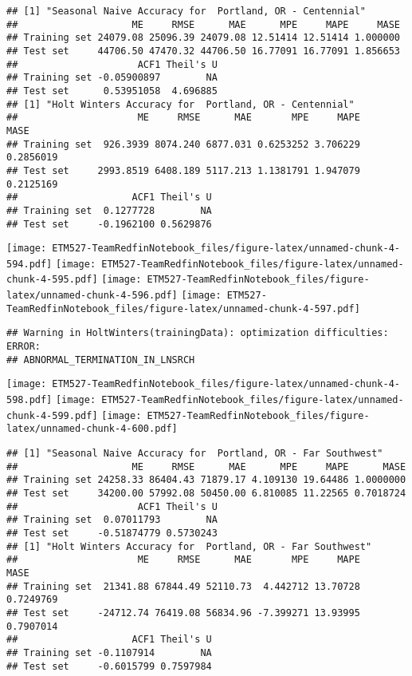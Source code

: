 \documentclass[]{article}
\begin{document}
\begin{verbatim}
## [1] "Seasonal Naive Accuracy for  Portland, OR - Centennial"
##                    ME     RMSE      MAE      MPE     MAPE     MASE
## Training set 24079.08 25096.39 24079.08 12.51414 12.51414 1.000000
## Test set     44706.50 47470.32 44706.50 16.77091 16.77091 1.856653
##                     ACF1 Theil's U
## Training set -0.05900897        NA
## Test set      0.53951058  4.696885
## [1] "Holt Winters Accuracy for  Portland, OR - Centennial"
##                     ME     RMSE      MAE       MPE     MAPE      MASE
## Training set  926.3939 8074.240 6877.031 0.6253252 3.706229 0.2856019
## Test set     2993.8519 6408.189 5117.213 1.1381791 1.947079 0.2125169
##                    ACF1 Theil's U
## Training set  0.1277728        NA
## Test set     -0.1962100 0.5629876
\end{verbatim}

\texttt{[image: ETM527-TeamRedfinNotebook\_files/figure-latex/unnamed-chunk-4-594.pdf]}
\texttt{[image: ETM527-TeamRedfinNotebook\_files/figure-latex/unnamed-chunk-4-595.pdf]}
\texttt{[image: ETM527-TeamRedfinNotebook\_files/figure-latex/unnamed-chunk-4-596.pdf]}
\texttt{[image: ETM527-TeamRedfinNotebook\_files/figure-latex/unnamed-chunk-4-597.pdf]}

\begin{verbatim}
## Warning in HoltWinters(trainingData): optimization difficulties: ERROR:
## ABNORMAL_TERMINATION_IN_LNSRCH
\end{verbatim}

\texttt{[image: ETM527-TeamRedfinNotebook\_files/figure-latex/unnamed-chunk-4-598.pdf]}
\texttt{[image: ETM527-TeamRedfinNotebook\_files/figure-latex/unnamed-chunk-4-599.pdf]}
\texttt{[image: ETM527-TeamRedfinNotebook\_files/figure-latex/unnamed-chunk-4-600.pdf]}

\begin{verbatim}
## [1] "Seasonal Naive Accuracy for  Portland, OR - Far Southwest"
##                    ME     RMSE      MAE      MPE     MAPE      MASE
## Training set 24258.33 86404.43 71879.17 4.109130 19.64486 1.0000000
## Test set     34200.00 57992.08 50450.00 6.810085 11.22565 0.7018724
##                     ACF1 Theil's U
## Training set  0.07011793        NA
## Test set     -0.51874779 0.5730243
## [1] "Holt Winters Accuracy for  Portland, OR - Far Southwest"
##                     ME     RMSE      MAE       MPE     MAPE      MASE
## Training set  21341.88 67844.49 52110.73  4.442712 13.70728 0.7249769
## Test set     -24712.74 76419.08 56834.96 -7.399271 13.93995 0.7907014
##                    ACF1 Theil's U
## Training set -0.1107914        NA
## Test set     -0.6015799 0.7597984
\end{verbatim}
\end{document}
